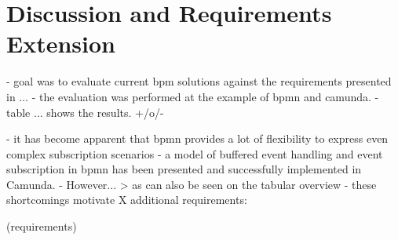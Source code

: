 \section{Discussion and Requirements Extension}\label{ch:ass:discussion}
- goal was to evaluate current bpm solutions against the requirements presented in ...
- the evaluation was performed at the example of bpmn and camunda.
- table ... shows the results. +/o/-


- it has become apparent that bpmn provides a lot of flexibility to express even complex subscription scenarios
- a model of buffered event handling and event subscription in bpmn has been presented and successfully implemented in Camunda.
- However...
> as can also be seen on the tabular overview
- these shortcomings motivate X additional requirements:

(requirements)

